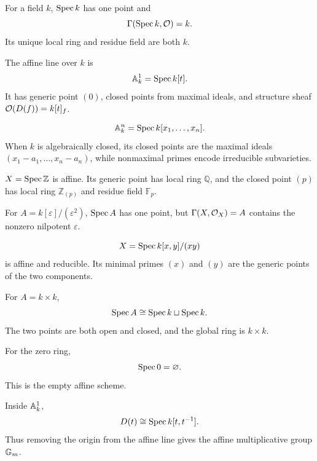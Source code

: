 \begin{example}
For a field $k$, $\operatorname{Spec} k$ has one point and
\[
\Gamma(\operatorname{Spec} k,\mathcal O)=k.
\]
Its unique local ring and residue field are both $k$.
\end{example}

\begin{example}
The affine line over $k$ is
\[
\mathbb A^1_k=\operatorname{Spec} k[t].
\]
It has generic point $(0)$, closed points from maximal ideals, and structure sheaf
$\mathcal O(D(f))=k[t]_f$.
\end{example}

\begin{example}
\[
\mathbb A^n_k=\operatorname{Spec} k[x_1,\dots,x_n].
\]
When $k$ is algebraically closed, its closed points are the maximal ideals
$(x_1-a_1,\dots,x_n-a_n)$, while nonmaximal primes encode irreducible subvarieties.
\end{example}

\begin{example}
$X=\operatorname{Spec}\mathbb Z$ is affine.  Its generic point has local ring $\mathbb Q$, and the closed
point $(p)$ has local ring $\mathbb Z_{(p)}$ and residue field $\mathbb F_p$.
\end{example}

\begin{example}
For $A=k[\varepsilon]/(\varepsilon^2)$, $\operatorname{Spec} A$ has one point, but
$\Gamma(X,\mathcal O_X)=A$ contains the nonzero nilpotent $\varepsilon$.
\end{example}

\begin{example}
\[
X=\operatorname{Spec} k[x,y]/(xy)
\]
is affine and reducible.  Its minimal primes $(x)$ and $(y)$ are the generic points of the
two components.
\end{example}

\begin{example}
For $A=k\times k$,
\[
\operatorname{Spec} A\cong\operatorname{Spec} k\sqcup\operatorname{Spec} k.
\]
The two points are both open and closed, and the global ring is $k\times k$.
\end{example}

\begin{example}
For the zero ring,
\[
\operatorname{Spec} 0=\varnothing.
\]
This is the empty affine scheme.
\end{example}

\begin{example}
Inside $\mathbb A^1_k$,
\[
D(t)\cong\operatorname{Spec} k[t,t^{-1}].
\]
Thus removing the origin from the affine line gives the affine multiplicative group $\mathbb G_m$.
\end{example}

